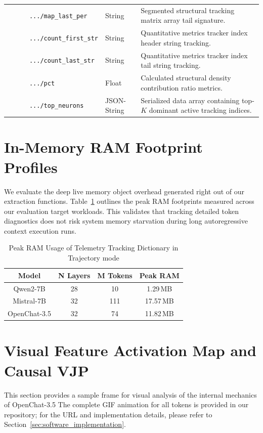 \documentclass[10pt,conference]{IEEEtran}
\begin{document}
\begin{table}[htbp]
\begin{tabular}{lll}
\texttt{\ \ \ \ \ \ .../map\_last\_per} & String & Segmented structural tracking matrix array tail signature. \\
\texttt{\ \ \ \ \ \ .../count\_first\_str} & String & Quantitative metrics tracker index header string tracking. \\
\texttt{\ \ \ \ \ \ .../count\_last\_str} & String & Quantitative metrics tracker index tail string tracking. \\
\texttt{\ \ \ \ \ \ .../pct} & Float & Calculated structural density contribution ratio metrics. \\
\texttt{\ \ \ \ \ \ .../top\_neurons} & JSON-String & Serialized data array containing top-$K$ dominant active tracking indices. \\
\bottomrule
\end{tabular}
\end{table}

\clearpage

\section{In-Memory RAM Footprint Profiles}
\label{appendix:ram_telemetry}

We evaluate the deep live memory object overhead generated right out of our extraction functions. Table~\ref{tab:ram_usage} outlines the peak RAM footprints measured across our evaluation target workloads. This validates that tracking detailed token diagnostics does not risk system memory starvation during long autoregressive context execution runs.

\begin{table}[htbp]
\centering
\caption{Peak RAM Usage of Telemetry Tracking Dictionary in Trajectory mode}
\label{tab:ram_usage}
\begin{tabular}{cccc}
\toprule
\textbf{Model} & \textbf{N Layers} & \textbf{M Tokens} & \textbf{Peak RAM} \\
\midrule
Qwen2-7B & 28 & 10 & 1.29\,MB \\
Mistral-7B & 32 & 111 & 17.57\,MB \\
OpenChat-3.5 & 32 & 74 & 11.82\,MB \\
\bottomrule
\end{tabular}
\end{table}

\section{Visual Feature Activation Map and Causal VJP}
\label{app:visual_maps}
This section provides a sample frame for visual analysis of the internal mechanics of OpenChat-3.5
The complete GIF animation for all tokens is provided in our repository; for the URL and implementation details, please refer to Section~\ref{sec:software_implementation}.
\end{document}
